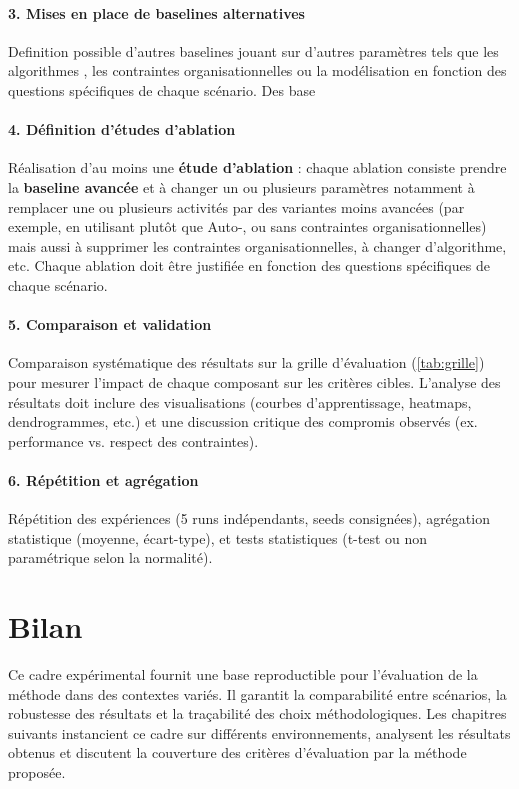 \paragraph{3. Mises en place de baselines alternatives}
Definition possible d'autres baselines jouant sur d'autres paramètres tels que les algorithmes , les contraintes organisationnelles ou la modélisation en fonction des questions spécifiques de chaque scénario. Des base

\paragraph{4. Définition d'études d'ablation}
Réalisation d'au moins une \textbf{étude d'ablation} : chaque ablation consiste prendre la \textbf{baseline avancée} et à changer un ou plusieurs paramètres notamment à remplacer une ou plusieurs activités  par des variantes moins avancées (par exemple, \texttt{} en utilisant  plutôt que Auto-, ou \texttt{} sans contraintes organisationnelles) mais aussi à supprimer les contraintes organisationnelles, à changer d'algorithme, etc. Chaque ablation doit être justifiée en fonction des questions spécifiques de chaque scénario.

\paragraph{5. Comparaison et validation}
Comparaison systématique des résultats sur la grille d'évaluation (\autoref{tab:grille}) pour mesurer l'impact de chaque composant sur les critères cibles. L'analyse des résultats doit inclure des visualisations (courbes d'apprentissage, heatmaps, dendrogrammes, etc.) et une discussion critique des compromis observés (ex. performance vs. respect des contraintes).

\paragraph{6. Répétition et agrégation}
Répétition des expériences (5 runs indépendants, seeds consignées), agrégation statistique (moyenne, écart-type), et tests statistiques (t-test ou non paramétrique selon la normalité).


\section{Bilan}

Ce cadre expérimental fournit une base reproductible pour l'évaluation de la méthode  dans des contextes variés. Il garantit la comparabilité entre scénarios, la robustesse des résultats et la traçabilité des choix méthodologiques. Les chapitres suivants instancient ce cadre sur différents environnements, analysent les résultats obtenus et discutent la couverture des critères d'évaluation par la méthode proposée.


